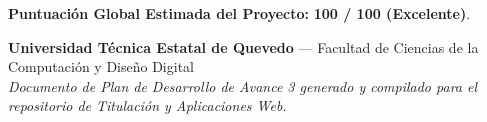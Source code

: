 \documentclass[10pt,a4paper]{article}
\begin{document}
\vspace{0.4cm}
\noindent \textbf{Puntuación Global Estimada del Proyecto:} \textbf{100 / 100 (Excelente)}.

\vspace{0.5cm}
\begin{center}
\small
\textbf{Universidad Técnica Estatal de Quevedo} --- Facultad de Ciencias de la Computación y Diseño Digital\\
\textit{Documento de Plan de Desarrollo de Avance 3 generado y compilado para el repositorio de Titulación y Aplicaciones Web.}
\end{center}
\end{document}
